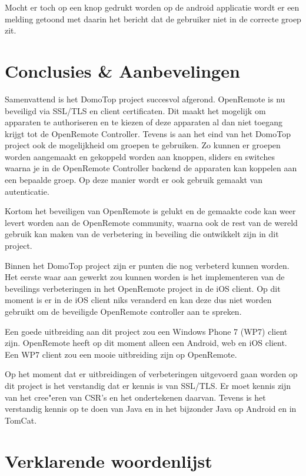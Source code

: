 \documentclass[]{article}
\begin{document}
Mocht er toch op een knop gedrukt worden op de android applicatie wordt er een
melding getoond met daarin het bericht dat de gebruiker niet in de correcte
groep zit. 

\newpage
\section{Conclusies \& Aanbevelingen}
Samenvattend is het DomoTop project succesvol afgerond. OpenRemote is nu beveiligd
via SSL/TLS en client certificaten. Dit maakt het mogelijk om apparaten te
authoriseren en te kiezen of deze apparaten al dan niet toegang krijgt tot de
OpenRemote Controller. Tevens is aan het eind van het DomoTop project ook de
mogelijkheid om groepen te gebruiken. Zo kunnen er groepen worden aangemaakt en
gekoppeld worden aan knoppen, sliders en switches waarna je in de OpenRemote
Controller backend de apparaten kan koppelen aan een bepaalde groep. Op deze
manier wordt er ook gebruik gemaakt van autenticatie.

Kortom het beveiligen van OpenRemote is gelukt en de gemaakte code kan weer
levert worden aan de OpenRemote community, waarna ook de rest van de wereld
gebruik kan maken van de verbetering in beveiling die ontwikkelt zijn in dit
project. 

Binnen het DomoTop project zijn er punten die nog verbeterd kunnen worden. Het eerste waar
aan gewerkt zou kunnen worden is het implementeren van de beveilings
verbeteringen in het OpenRemote project in de iOS client. Op dit moment is er in
de iOS client niks veranderd en kan deze dus niet worden gebruikt om de
beveiligde OpenRemote controller aan te spreken.

Een goede uitbreiding aan dit project zou een Windows Phone 7 (WP7) client zijn.
OpenRemote heeft op dit moment alleen een Android, web en iOS client. Een WP7
client zou een mooie uitbreiding zijn op OpenRemote.

Op het moment dat er uitbreidingen of verbeteringen uitgevoerd gaan worden op
dit project is het verstandig dat er kennis is van SSL/TLS. Er moet kennis zijn
van het cree"eren van CSR's en het ondertekenen daarvan. Tevens is het
verstandig kennis op te doen van Java en in het bijzonder Java op Android en in
TomCat.

\newpage
\section{Verklarende woordenlijst}
\end{document}
